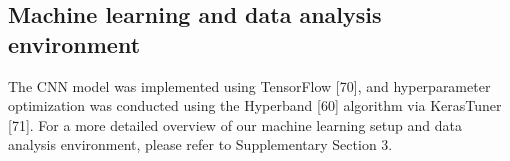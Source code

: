 \subsection{Machine learning and data analysis environment}
The CNN model was implemented using TensorFlow [70], and hyperparameter optimization was conducted using the Hyperband [60] algorithm via KerasTuner [71].
For a more detailed overview of our machine learning setup and data analysis environment, please refer to Supplementary Section 3.
